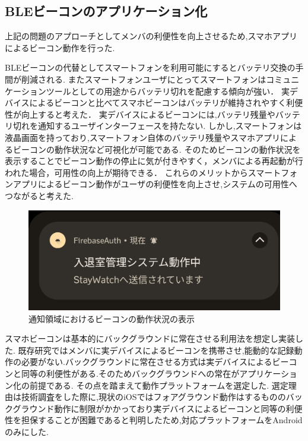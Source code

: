 \subsection{ BLEビーコンのアプリケーション化}
上記の問題のアプローチとしてメンバの利便性を向上させるため,スマホアプリによるビーコン動作を行った.

BLEビーコンの代替としてスマートフォンを利用可能にするとバッテリ交換の手間が削減される.
またスマートフォンユーザにとってスマートフォンはコミュニケーションツールとしての用途からバッテリ切れを配慮する傾向が強い．
実デバイスによるビーコンと比べてスマホビーコンはバッテリが維持されやすく利便性が向上すると考えた．
実デバイスによるビーコンには,バッテリ残量やバッテリ切れを通知するユーザインターフェースを持たない.
しかし,スマートフォンは液晶画面を持っており,スマートフォン自体のバッテリ残量やスマホアプリによるビーコンの動作状況など可視化が可能である.
そのためビーコンの動作状況を表示することでビーコン動作の停止に気が付きやすく，メンバによる再起動が行われた場合，可用性の向上が期待できる．
これらのメリットからスマートフォンアプリによるビーコン動作がユーザの利便性を向上させ,システムの可用性へつながると考えた.


\begin{figure}[tbh]
  \centering
  \includegraphics[width=12cm]{image/AppNofication.png}
  \caption{通知領域におけるビーコンの動作状況の表示}
  \label{multipleBPM}
\end{figure}


スマホビーコンは基本的にバックグラウンドに常在させる利用法を想定し実装した.
既存研究ではメンバに実デバイスによるビーコンを携帯させ,能動的な記録動作の必要がない.バックグラウンドに常在させる方式は実デバイスによるビーコンと同等の利便性がある.そのためバックグラウンドへの常在がアプリケーション化の前提である.
その点を踏まえて動作プラットフォームを選定した.
選定理由は技術調査をした際に,現状のiOSではフォアグラウンド動作はするもののバックグラウンド動作に制限がかかっており実デバイスによるビーコンと同等の利便性を担保することが困難であると判明したため,対応プラットフォームをAndroidのみにした.

